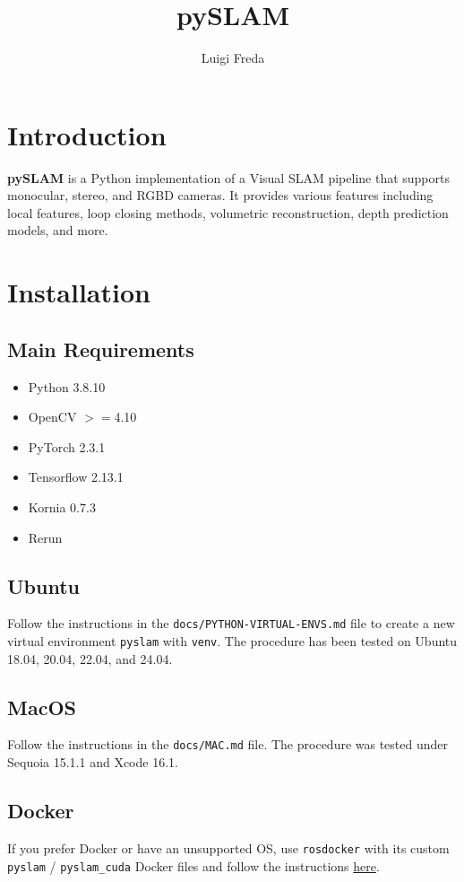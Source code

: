 \documentclass{article}
\title{pySLAM}
\author{Luigi Freda}
\date{}  %
\begin{document}
\maketitle

\section{Introduction}
\textbf{pySLAM} is a Python implementation of a Visual SLAM pipeline that supports monocular, stereo, and RGBD cameras. It provides various features including local features, loop closing methods, volumetric reconstruction, depth prediction models, and more.

\section{Installation}

\subsection{Main Requirements}
\begin{itemize}
    \item Python 3.8.10
    \item OpenCV $>=$4.10
    \item PyTorch 2.3.1
    \item Tensorflow 2.13.1
    \item Kornia 0.7.3
    \item Rerun
\end{itemize}

\subsection{Ubuntu}
Follow the instructions in the \texttt{docs/PYTHON-VIRTUAL-ENVS.md} file to create a new virtual environment \texttt{pyslam} with \texttt{venv}. The procedure has been tested on Ubuntu 18.04, 20.04, 22.04, and 24.04.

\subsection{MacOS}
Follow the instructions in the \texttt{docs/MAC.md} file. The procedure was tested under Sequoia 15.1.1 and Xcode 16.1.

\subsection{Docker}
If you prefer Docker or have an unsupported OS, use \texttt{rosdocker} with its custom \texttt{pyslam} / \texttt{pyslam\_cuda} Docker files and follow the instructions \href{https://github.com/luigifreda/rosdocker#pyslam}{here}.
\end{document}
